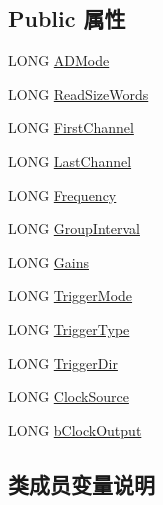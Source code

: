 \subsection*{Public 属性}
\begin{DoxyCompactItemize}
\item 
L\+O\+NG \hyperlink{struct___u_s_b2089___p_a_r_a___a_d_a8e4e21c70f5f392b71a111a3df90deb1}{A\+D\+Mode}
\item 
L\+O\+NG \hyperlink{struct___u_s_b2089___p_a_r_a___a_d_ad337e2c8a8ab80adf0721f273af39b5b}{Read\+Size\+Words}
\item 
L\+O\+NG \hyperlink{struct___u_s_b2089___p_a_r_a___a_d_a37a8a439bcde128816b7f9bb206f9906}{First\+Channel}
\item 
L\+O\+NG \hyperlink{struct___u_s_b2089___p_a_r_a___a_d_a5e53b9537aad636c0e28c20ffe944814}{Last\+Channel}
\item 
L\+O\+NG \hyperlink{struct___u_s_b2089___p_a_r_a___a_d_a214d91a7b62122358aee9225ef604369}{Frequency}
\item 
L\+O\+NG \hyperlink{struct___u_s_b2089___p_a_r_a___a_d_a90588f72e8d53708e73c7d806f990d4f}{Group\+Interval}
\item 
L\+O\+NG \hyperlink{struct___u_s_b2089___p_a_r_a___a_d_a940668fdf91fa5d30cbb76e3c2af632f}{Gains}
\item 
L\+O\+NG \hyperlink{struct___u_s_b2089___p_a_r_a___a_d_a21784127891ec6b61e1c540eeeebbdf8}{Trigger\+Mode}
\item 
L\+O\+NG \hyperlink{struct___u_s_b2089___p_a_r_a___a_d_a40a568ec452439655638e36c8b11c438}{Trigger\+Type}
\item 
L\+O\+NG \hyperlink{struct___u_s_b2089___p_a_r_a___a_d_a7e2a33fc23abe47b91154e556e85c991}{Trigger\+Dir}
\item 
L\+O\+NG \hyperlink{struct___u_s_b2089___p_a_r_a___a_d_a61fb08b66760f8d2a26b9d0514ef2040}{Clock\+Source}
\item 
L\+O\+NG \hyperlink{struct___u_s_b2089___p_a_r_a___a_d_ad1f0e7462f81ac385fa36525160ba3a5}{b\+Clock\+Output}
\end{DoxyCompactItemize}


\subsection{类成员变量说明}
